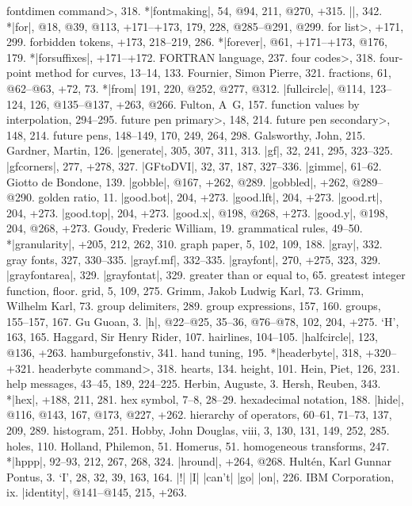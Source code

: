 \<fontdimen command>, 318.
*|fontmaking|, 54, @94, 211, @270, +315.
|\fontname|, 342.
*|for|, @18, @39, @113, +171--+173, 179, 228, @285--@291, @299.
\<for list>, +171, 299.
forbidden tokens, +173, 218--219, 286.
*|forever|, @61, +171--+173, @176, 179.
*|forsuffixes|, +171--+172.
{\sevenrm FORTRAN} language, 237.
\<four codes>, 318.
four-point method for curves, 13--14, 133.
Fournier, Simon Pierre, 321. %
fractions, 61, @62--@63, +72, 73.
*|from| 191, 220, @252, @277, @312.
|fullcircle|, @114, 123--124, 126, @135--@137, +263, @266.
Fulton, A\period\ G\period, 157.
function values by interpolation, 294--295.
\<future pen primary>, 148, 214.
\<future pen secondary>, 148, 214.
future pens, 148--149, 170, 249, 264, 298.
\newletter
Galsworthy, John, 215.
Gardner, Martin, 126.
|generate|, 305, 307, 311, 313.
|gf|, 32, 241, 295, 323--325.
|gfcorners|, 277, +278, 327.
|GFtoDVI|, 32, 37, 187, 327--336.
|gimme|, 61--62.
Giotto de Bondone, 139.
|gobble|, @167, +262, @289.
|gobbled|, +262, @289--@290.
golden ratio, 11.
|good.bot|, 204, +273.
|good.lft|, 204, +273.
|good.rt|, 204, +273.
|good.top|, 204, +273.
|good.x|, @198, @268, +273.
|good.y|, @198, 204, @268, +273.
Goudy, Frederic William, 19.
grammatical rules, 49--50.
*|granularity|, +205, 212, 262, 310.
graph paper, 5, 102, 109, 188.
|gray|, 332.
gray fonts, 327, 330--335.
|grayf.mf|, 332--335.
|grayfont|, 270, +275, 323, 329.
|grayfontarea|, 329.
|grayfontat|, 329.
greater than or equal to, 65.
greatest integer function, \see floor.
grid, 5, 109, 275.
Grimm, Jakob Ludwig Karl, 73.
Grimm, Wilhelm Karl, 73.
group delimiters, 289.
group expressions, 157, 160.
groups, 155--157, 167.
Gu Guoan, 3.
\newletter
|h|, @22--@25, 35--36, @76--@78, 102, 204, +275.
`H', 163, 165.
Haggard, Sir Henry Rider, 107.
hairlines, 104--105.
|halfcircle|, 123, @136, +263.
hamburgefonstiv, 341.
hand tuning, 195.
*|headerbyte|, 318, +320--+321.
\<headerbyte command>, 318.
hearts, 134.
height, 101.
Hein, Piet, 126, 231.
help messages, 43--45, 189, 224--225.
Herbin, Auguste, 3.
Hersh, Reuben, 343.
*|hex|, +188, 211, 281.
hex symbol, 7--8, 28--29.
hexadecimal notation, 188.
|hide|, @116, @143, 167, @173, @227, +262.
hierarchy of operators, 60--61, 71--73, 137, 209, 289.
histogram, 251.
Hobby, John Douglas, viii, 3, 130, 131, 149, 252, 285.
holes, 110.
Holland, Philemon, 51.
Homerus, 51.
homogeneous transforms, 247.
*|hppp|, 92--93, 212, 267, 268, 324.
|hround|, +264, @268.
Hult\'en, Karl Gunnar Pontus, 3.
\newletter
`I', 28, 32, 39, 163, 164.
|!| |I| |can't| |go| |on|, 226.
IBM Corporation, ix.
|identity|, @141--@145, 215, +263.
